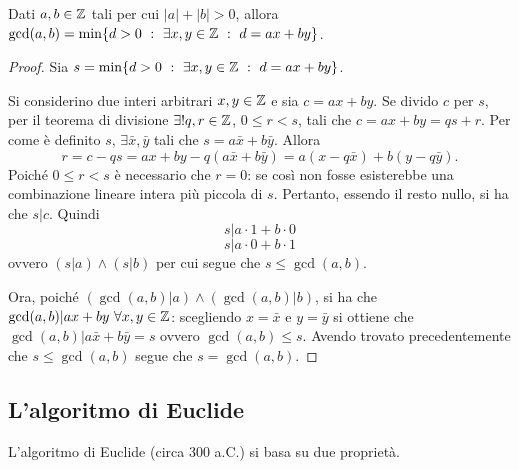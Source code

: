 \begin{teorema}
Dati $a,b\in\operatorname*{\mathbb{Z}}$ tali per cui $|a|+|b|>0$, allora $\gcd(a,b)=\min\{d>0\ :\ \exists x,y\in\operatorname*{\mathbb{Z}}\ :\ d=ax+by\}$.
\end{teorema}
\begin{proof}
Sia $s=\min\{d>0\ :\ \exists x,y\in\Z\ :\ d=ax+by\}$. 

Si considerino due interi arbitrari $x,y\in\operatorname*{\mathbb{Z}}$ e sia $c=ax+by$. Se divido $c$ per $s$, per il teorema di divisione $\exists ! q,r\in\operatorname*{\mathbb{Z}}$, $0 \leq r < s$, tali che $c=ax+by=qs+r$. Per come è definito $s$, $\exists \bar{x},\bar{y}$ tali che $s=a\bar{x}+b\bar{y}$. Allora
\[
r=c-qs=ax+by-q(a\bar{x}+b\bar{y})=a(x-q\bar{x})+b(y-q\bar{y}).
\]
Poiché $0 \leq r < s$ è necessario che $r=0$: se così non fosse esisterebbe una combinazione lineare intera più piccola di $s$. Pertanto, essendo il resto nullo, si ha che $s|c$. Quindi
\[
s|a\cdot 1 + b\cdot 0
\]
\[
s|a\cdot 0 + b\cdot 1
\]
ovvero $(s|a) \land (s|b)$ per cui segue che $s\leq \gcd(a,b)$.

Ora, poiché $(\gcd(a,b)|a) \land (\gcd(a,b)|b)$, si ha che $\gcd(a,b)|ax+by\ \forall x,y\in\operatorname*{\mathbb{Z}}$: scegliendo $x=\bar{x}$ e $y=\bar{y}$ si ottiene che $\gcd(a,b)|a\bar{x}+b\bar{y}=s$ ovvero $\gcd(a,b)\leq s$. Avendo trovato precedentemente che $s\leq\gcd(a,b)$ segue che $s=\gcd(a,b)$.
\end{proof}

\subsection{L'algoritmo di Euclide}
L'algoritmo di Euclide (circa 300 a.C.) si basa su due proprietà. 

